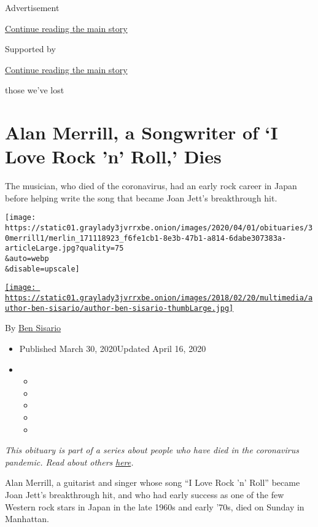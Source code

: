 Advertisement

\protect\hyperlink{after-top}{Continue reading the main story}

Supported by

\protect\hyperlink{after-sponsor}{Continue reading the main story}

those we've lost

\hypertarget{alan-merrill-a-songwriter-of-i-love-rock-n-roll-dies}{%
\section{Alan Merrill, a Songwriter of `I Love Rock 'n' Roll,'
Dies}\label{alan-merrill-a-songwriter-of-i-love-rock-n-roll-dies}}

The musician, who died of the coronavirus, had an early rock career in
Japan before helping write the song that became Joan Jett's breakthrough
hit.

\texttt{[image: https://static01.graylady3jvrrxbe.onion/images/2020/04/01/obituaries/30merrill1/merlin\_171118923\_f6fe1cb1-8e3b-47b1-a814-6dabe307383a-articleLarge.jpg?quality=75\\\&auto=webp\\\&disable=upscale]}

\href{https://www.nytimes3xbfgragh.onion/by/ben-sisario}{\texttt{[image: https://static01.graylady3jvrrxbe.onion/images/2018/02/20/multimedia/author-ben-sisario/author-ben-sisario-thumbLarge.jpg]}}

By \href{https://www.nytimes3xbfgragh.onion/by/ben-sisario}{Ben Sisario}

\begin{itemize}
\item
  Published March 30, 2020Updated April 16, 2020
\item
  \begin{itemize}
  \item
  \item
  \item
  \item
  \item
  \end{itemize}
\end{itemize}

\emph{This obituary is part of a series about people who have died in
the coronavirus pandemic. Read about others}
\href{https://www.nytimes3xbfgragh.onion/series/people-who-have-died-of-the-coronavirus}{\emph{here}}\emph{.}

Alan Merrill, a guitarist and singer whose song ``I Love Rock 'n' Roll''
became Joan Jett's breakthrough hit, and who had early success as one of
the few Western rock stars in Japan in the late 1960s and early '70s,
died on Sunday in Manhattan.


